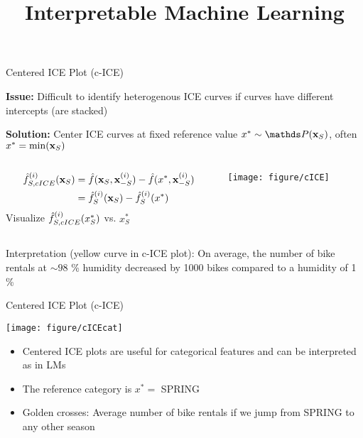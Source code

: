 \documentclass[10pt,compress,t,notes=noshow, xcolor=table]{beamer}
\title{Interpretable Machine Learning}
\date{}
\begin{document}



\begin{frame}{Centered ICE Plot (c-ICE)}

\textbf{Issue:} Difficult to identify heterogenous ICE curves if curves have different intercepts (are stacked)

\textbf{Solution:} Center ICE curves at fixed reference value $x^* \sim \P(\xv_S)$, often $x^* = \min(\mathbf{x}_S)$

\begin{columns}[c]
\begin{column}{0.4\textwidth}
\centering
$$\begin{aligned}
\hat{f}_{S, cICE}^{(i)}(\mathbf{x}_S)
&= \hat{f}(\mathbf{x}_S, \mathbf{x}^{(i)}_{-S}) - \hat{f}(x^*, \mathbf{x}^{(i)}_{-S}) \\
&= \hat{f}_{S}^{(i)}(\mathbf{x}_S) - \hat{f}_{S}^{(i)}(x^*)
\end{aligned}$$
Visualize $\hat{f}_{S, cICE}^{(i)}(x_S^*)$ vs. $x_S^*$
\end{column}
\begin{column}{0.59\textwidth}
\begin{center}
\texttt{[image: figure/cICE]}
\end{center}
\end{column}
\end{columns}


Interpretation (yellow curve in c-ICE plot): On average, the number of bike rentals at $\sim 98$ \% humidity decreased by 1000 bikes compared to a humidity of 1 \%
\end{frame}


\begin{frame}{Centered ICE Plot (c-ICE)}

\begin{center}
\texttt{[image: figure/cICEcat]}
\end{center}

\begin{itemize}
\item Centered ICE plots are useful for categorical features and can be interpreted as in LMs
\item The reference category is $x^* =$ SPRING
\item Golden crosses: Average number of bike rentals if we jump from SPRING to any other season
\end{itemize}

\end{frame}
\end{document}
